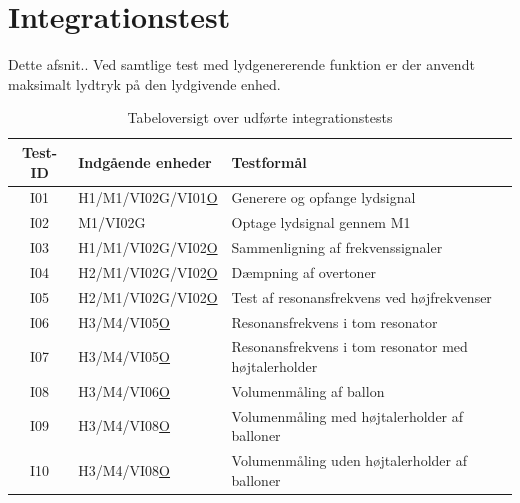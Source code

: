 \section{Integrationstest}

Dette afsnit..
Ved samtlige test med lydgenererende funktion er der anvendt maksimalt lydtryk på den lydgivende enhed.\\
			
\begin{table}[htb]
				\centering
				\caption{Tabeloversigt over udførte integrationstests} 
				\label{integrationstest}
				\begin{tabular}{cll}
					\multicolumn{1}{c|}{\textbf{Test-ID}} &
					\multicolumn{1}{l|}{\textbf{Indgående enheder}} & 	  \textbf{Testformål} \\ \hline
					\multicolumn{1}{c|}{I01} &
					\multicolumn{1}{l|}{H1/M1/VI02G/VI01\underline{O}}&Generere og opfange lydsignal\\	
					
					\multicolumn{1}{c|}{I02} &
					\multicolumn{1}{l|}{M1/VI02G}&Optage lydsignal gennem M1\\	
					
					\multicolumn{1}{c|}{I03} &
					\multicolumn{1}{l|}{H1/M1/VI02G/VI02\underline{O}}&Sammenligning af frekvenssignaler\\
					
					\multicolumn{1}{c|}{I04} &
					\multicolumn{1}{l|}{H2/M1/VI02G/VI02\underline{O}}&Dæmpning af overtoner\\
					
					\multicolumn{1}{c|}{I05} &
					\multicolumn{1}{l|}{H2/M1/VI02G/VI02\underline{O}}&Test af resonansfrekvens ved højfrekvenser\\	
					
					\multicolumn{1}{c|}{I06} &
					\multicolumn{1}{l|}{H3/M4/VI05\underline{O}}&Resonansfrekvens i tom resonator\\
					
					\multicolumn{1}{c|}{I07} &
					\multicolumn{1}{l|}{H3/M4/VI05\underline{O}}&Resonansfrekvens i tom resonator med højtalerholder\\	
					
					\multicolumn{1}{c|}{I08} &
					\multicolumn{1}{l|}{H3/M4/VI06\underline{O}}&Volumenmåling af ballon\\
					
					\multicolumn{1}{c|}{I09} &
					\multicolumn{1}{l|}{H3/M4/VI08\underline{O}}&Volumenmåling med højtalerholder af balloner\\	
					
					\multicolumn{1}{c|}{I10} &
					\multicolumn{1}{l|}{H3/M4/VI08\underline{O}}&Volumenmåling uden højtalerholder af balloner\\	
						
				\end{tabular}
			\end{table}
	



